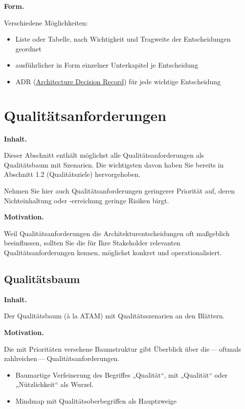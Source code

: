 \documentclass[]{article}
\begin{document}
\textbf{Form.}

Verschiedene Möglichkeiten:

\begin{itemize}
\item
  Liste oder Tabelle, nach Wichtigkeit und Tragweite der Entscheidungen
  geordnet
\item
  ausführlicher in Form einzelner Unterkapitel je Entscheidung
\item
  ADR
  (\href{http://thinkrelevance.com/blog/2011/11/15/documenting-architecture-decisions}{Architecture
  Decision Record}) für jede wichtige Entscheidung
\end{itemize}

\hypertarget{section-quality-scenarios}{%
\section{Qualitätsanforderungen}\label{section-quality-scenarios}}

\textbf{Inhalt.}

Dieser Abschnitt enthält möglichst alle Qualitätsanforderungen als
Qualitätsbaum mit Szenarien. Die wichtigsten davon haben Sie bereits in
Abschnitt 1.2 (Qualitätsziele) hervorgehoben.

Nehmen Sie hier auch Qualitätsanforderungen geringerer Priorität auf,
deren Nichteinhaltung oder -erreichung geringe Risiken birgt.

\textbf{Motivation.}

Weil Qualitätsanforderungen die Architekturentscheidungen oft maßgeblich
beeinflussen, sollten Sie die für Ihre Stakeholder relevanten
Qualitätsanforderungen kennen, möglichst konkret und operationalisiert.

\hypertarget{_qualit_tsbaum}{%
\subsection{Qualitätsbaum}\label{_qualit_tsbaum}}

\textbf{Inhalt.}

Der Qualitätsbaum (à la ATAM) mit Qualitätsszenarien an den Blättern.

\textbf{Motivation.}

Die mit Prioritäten versehene Baumstruktur gibt Überblick über
die --- oftmals zahlreichen --- Qualitätsanforderungen.

\begin{itemize}
\item
  Baumartige Verfeinerung des Begriffes „Qualität``, mit „Qualität``
  oder „Nützlichkeit`` als Wurzel.
\item
  Mindmap mit Qualitätsoberbegriffen als Hauptzweige
\end{itemize}
\end{document}
